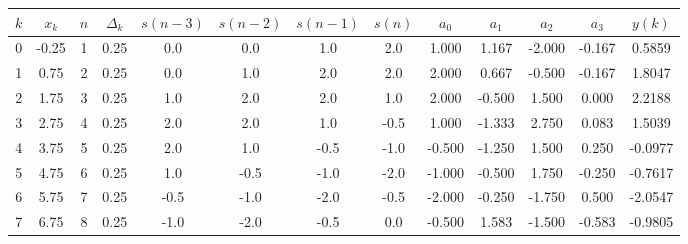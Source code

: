 \documentclass[border=3mm]{standalone}
\begin{document}
\begin{tabular}{
		*{1}{S[table-format = 2.0]}
		*{1}{S[table-format = 2.2]}
		*{1}{S[table-format = 2.0]}
		*{1}{S[table-format = 2.2]}
		*{1}{S[table-format = 3.1]}
		*{1}{S[table-format = 3.1]}
		*{1}{S[table-format = 3.1]}
		*{1}{S[table-format = 3.1]}
		*{1}{S[table-format = 3.3]}
		*{1}{S[table-format = 3.3]}
		*{1}{S[table-format = 3.3]}
		*{1}{S[table-format = 3.3]}
		*{1}{S[table-format = 3.4]}
	}
	
\toprule
{$k$} & {$x_k$}  &   {$n$}  &   {$\Delta_k$}  & {$s(n-3)$} &  {$s(n-2)$} &  {$s(n-1)$} &  {$s(n)$} & {$a_0$}  &  {$a_1$} & {$a_2$} & {$a_3$} & {$y(k)$}\\  
 & -0.25 &  1 &  0.25  &	\color{red} 0.0	& \color{red} 0.0	&  1.0 &   2.0 				&   1.000 &   1.167 & -2.000 & -0.167 &   0.5859 \\
  1 &  0.75 &  2 &  0.25  &	\color{red} 0.0	&  1.0  			&  2.0 &   2.0 				&   2.000 &   0.667 & -0.500 & -0.167 &   1.8047 \\
  2 &  1.75 &  3 &  0.25  &   1.0   		&  2.0  			&  2.0 &   1.0 				&   2.000 &  -0.500 &  1.500 &  0.000 &   2.2188 \\
  3 &  2.75 &  4 &  0.25  &   2.0   		&  2.0  			&  1.0 &  -0.5 				&   1.000 &  -1.333 &  2.750 &  0.083 &   1.5039 \\
  4 &  3.75 &  5 &  0.25  &   2.0   		&  1.0  			& -0.5 &  -1.0 				&  -0.500 &  -1.250 &  1.500 &  0.250 &  -0.0977 \\
  5 &  4.75 &  6 &  0.25  &   1.0   		& -0.5  			& -1.0 &  -2.0 				&  -1.000 &  -0.500 &  1.750 & -0.250 &  -0.7617 \\
  6 &  5.75 &  7 &  0.25  &  -0.5   		& -1.0  			& -2.0 &  -0.5 				&  -2.000 &  -0.250 & -1.750 &  0.500 &  -2.0547 \\
  7 &  6.75 &  8 &  0.25  &  -1.0   		& -2.0  			& -0.5 &  \color{red} 0.0	&  -0.500 &   1.583 & -1.500 & -0.583 &  -0.9805 \\
\bottomrule

\end{tabular}
\end{document}
